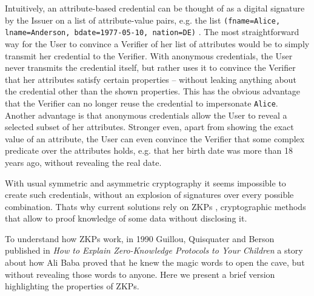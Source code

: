 Intuitively, an attribute-based credential can be thought of as a digital signature by the Issuer on a list of attribute-value pairs, e.g. the list \texttt{\justify(fname=Alice, lname=Anderson, bdate=1977-05-10, nation=DE)} \citep{introCredIBM}.
The most straightforward way for the User to convince a Verifier of her list of attributes would be to simply transmit her credential to the Verifier.
With anonymous credentials, the User never transmits the credential itself, but rather uses it to convince the Verifier that her attributes satisfy certain properties – without leaking anything about the credential other than the shown properties. This has the obvious advantage that the Verifier can no longer reuse the credential to impersonate \texttt{Alice}. Another advantage is that anonymous credentials allow the User to reveal a selected subset of her attributes.
Stronger even, apart from showing the exact value of an attribute, the User can even convince the
Verifier that some complex predicate over the attributes holds, e.g. that her birth date was more than 18 years ago, without revealing the real date.


With usual symmetric and asymmetric cryptography it seems impossible to create such credentials, without an explosion of signatures over every possible combination. Thats why current solutions rely on  \acp{ZKP}
, cryptographic methods that allow to proof knowledge of some data without disclosing it.

To understand how ZKPs work, in 1990 Guillou, Quisquater and Berson published in \textit{How to Explain Zero-Knowledge Protocols to Your Children} \citep{ZKPcave:story} a story about how Ali Baba proved that he knew the magic words to open the cave, but without revealing those words to anyone. Here we present a brief version highlighting the properties of ZKPs.

\hfil

